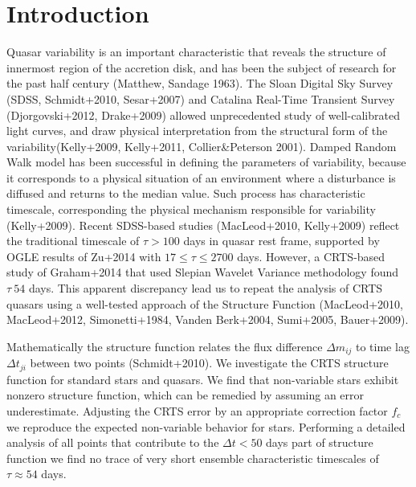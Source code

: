 \documentclass[a4paper,fleqn,usenatbib]{mnras}
\begin{document}


\section{Introduction}
\label{sec:intro}

Quasar variability is an important characteristic that reveals the structure of innermost region of the accretion disk, and has been the subject of research for the past half century (Matthew, Sandage 1963).   The Sloan Digital Sky Survey (SDSS, Schmidt+2010, Sesar+2007) and Catalina Real-Time Transient Survey (Djorgovski+2012, Drake+2009) allowed unprecedented study of well-calibrated light curves, and draw physical interpretation from the structural form of the variability(Kelly+2009, Kelly+2011, Collier\&Peterson 2001). Damped Random Walk model has been successful in defining the parameters of variability, because it corresponds to a physical situation of an environment where a disturbance is diffused and returns to the median value. Such process has characteristic timescale, corresponding the physical mechanism responsible for variability (Kelly+2009).  Recent SDSS-based studies (MacLeod+2010, Kelly+2009) reflect the traditional timescale of $\tau > 100 $ days in quasar rest frame, supported by OGLE results of Zu+2014 with $ 17 \leq \tau \leq 2700 $ days. However, a CRTS-based study of Graham+2014 that used Slepian Wavelet Variance methodology found $\tau ~ 54$ days. This apparent discrepancy lead us to repeat the analysis of CRTS quasars using a  well-tested approach of the Structure Function (MacLeod+2010, MacLeod+2012, Simonetti+1984, Vanden Berk+2004, Sumi+2005, Bauer+2009). 

Mathematically the structure function relates the flux difference $\Delta m_{ij}$ to time lag $\Delta t_{ji}$  between two points (Schmidt+2010). We investigate the CRTS structure function for standard stars and quasars. We find that non-variable stars exhibit nonzero structure function, which can be remedied by assuming an error underestimate. Adjusting the CRTS error by an appropriate correction factor $f_{c}$ we reproduce the expected non-variable behavior for stars. Performing a detailed analysis of all points that contribute to the  $\Delta t < 50$ days part of structure function we find no trace of very short ensemble characteristic timescales of $\tau \approx 54$ days. 
 
\end{document}
